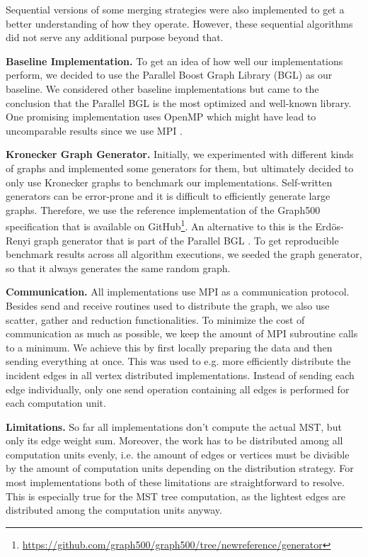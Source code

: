 \documentclass[letterpaper]{article}
\newcommand{\mypar}[1]{{\bf #1.}}
\begin{document}
Sequential versions of some merging strategies were also implemented to get a better understanding of how they operate.
However, these sequential algorithms did not serve any additional purpose beyond that.

\mypar{Baseline Implementation}
To get an idea of how well our implementations perform, we decided to use the Parallel Boost Graph Library (BGL)
\cite{bgl} as our baseline. We considered other baseline implementations but came to the conclusion that the Parallel
BGL is the most optimized and well-known library. One promising implementation uses OpenMP which might have lead to
uncomparable results since we use MPI \cite{15418}. %

\mypar{Kronecker Graph Generator}
Initially, we experimented with different kinds of graphs and implemented some generators for them, but ultimately
decided to only use Kronecker graphs to benchmark our implementations. Self-written generators can be error-prone and it
is difficult to efficiently generate large graphs. Therefore, we use the reference implementation of the Graph500
specification that is available on
GitHub\footnote{\url{https://github.com/graph500/graph500/tree/newreference/generator}}. An alternative to this is the
Erdös-Renyi graph generator that is part of the Parallel BGL \cite{bgl}. To get reproducible benchmark results across
all algorithm executions, we seeded the graph generator, so that it always generates the same random graph.

\mypar{Communication}
All implementations use MPI as a communication protocol. Besides send and receive routines used to distribute the graph,
we also use scatter, gather and reduction functionalities. %
To minimize the cost of communication as much as possible, we keep the amount of MPI subroutine calls to a minimum. We
achieve this by first locally preparing the data and then sending everything at once. This was used to e.g. more
efficiently distribute the incident edges in all vertex distributed implementations. Instead of sending each edge
individually, only one send operation containing all edges is performed for each computation unit.

\mypar{Limitations}
So far all implementations don't compute the actual MST, but only its edge weight sum. Moreover, the work has to be
distributed among all computation units evenly, i.e. the amount of edges or vertices must be divisible by the amount of
computation units depending on the distribution strategy. For most implementations both of these limitations are
straightforward to resolve. This is especially true for the MST tree computation, as the lightest edges are distributed
among the computation units anyway.
\end{document}

